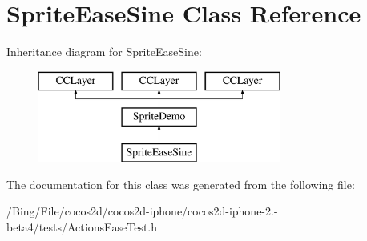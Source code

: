 \hypertarget{interface_sprite_ease_sine}{\section{Sprite\-Ease\-Sine Class Reference}
\label{interface_sprite_ease_sine}
}
Inheritance diagram for Sprite\-Ease\-Sine\-:\begin{figure}[H]
\begin{center}
\leavevmode
\includegraphics[height=3.000000cm]{interface_sprite_ease_sine}
\end{center}
\end{figure}


The documentation for this class was generated from the following file\-:\begin{DoxyCompactItemize}
\item 
/\-Bing/\-File/cocos2d/cocos2d-\/iphone/cocos2d-\/iphone-\/2.-\/beta4/tests/Actions\-Ease\-Test.\-h\end{DoxyCompactItemize}
